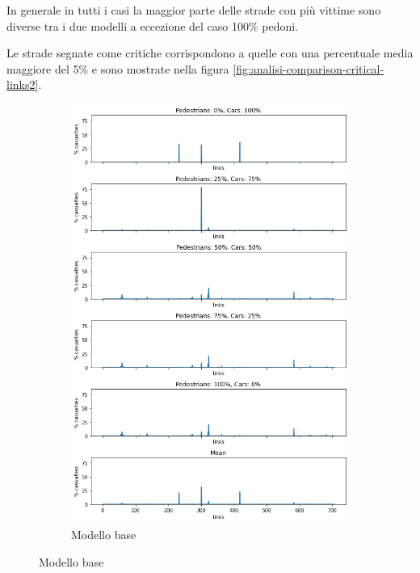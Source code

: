 In generale in tutti i casi la maggior parte delle strade con più vittime sono diverse tra i due modelli a eccezione del caso 
100\% pedoni.

Le strade segnate come critiche corrispondono a quelle con una percentuale media maggiore del 5\% e sono mostrate nella figura \ref{fig:analisi-comparison-critical-links2}.

\newpage

\begin{figure}[p]
    \centering
    \begin{subfigure}{0.475\textwidth}
        \centering
        \includegraphics[width=\textwidth]{images/analisi/base_links_casualties}
        \caption{Modello base}
        \label{fig:base-link-casualties}
    \end{subfigure}

\end{figure}
